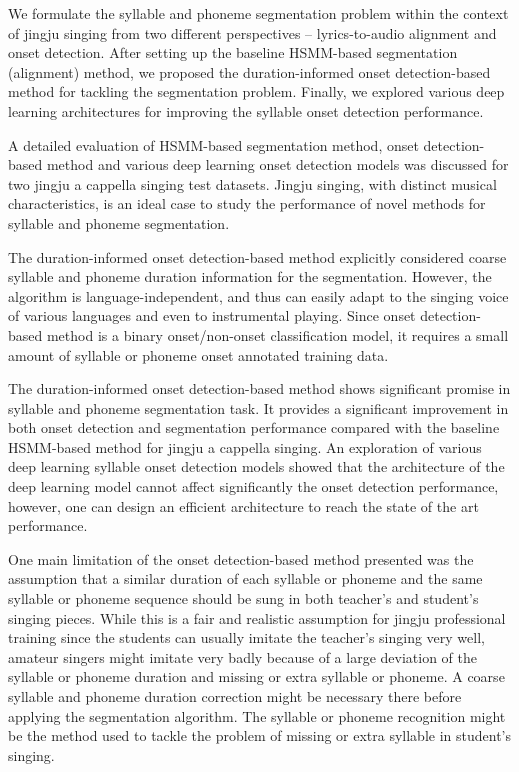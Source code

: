 We formulate the syllable and phoneme segmentation problem within the context of jingju singing from two different perspectives -- lyrics-to-audio alignment and onset detection. After setting up the baseline HSMM-based segmentation (alignment) method, we proposed the duration-informed onset detection-based method for tackling the segmentation problem. Finally, we explored various deep learning architectures for improving the syllable onset detection performance.

A detailed evaluation of HSMM-based segmentation method, onset detection-based method and various deep learning onset detection models was discussed for two jingju a cappella singing test datasets. Jingju singing, with distinct musical characteristics, is an ideal case to study the performance of novel methods for syllable and phoneme segmentation.

The duration-informed onset detection-based method explicitly considered coarse syllable and phoneme duration information for the segmentation. However, the algorithm is language-independent, and thus can easily adapt to the singing voice of various languages and even to instrumental playing. Since onset detection-based method is a binary onset/non-onset classification model, it requires a small amount of syllable or phoneme onset annotated training data.

The duration-informed onset detection-based method shows significant promise in syllable and phoneme segmentation task. It provides a significant improvement in both onset detection and segmentation performance compared with the baseline HSMM-based method for jingju a cappella singing. An exploration of various deep learning syllable onset detection models showed that the architecture of the deep learning model cannot affect significantly the onset detection performance, however, one can design an efficient architecture to reach the state of the art performance.

One main limitation of the onset detection-based method presented was the assumption that a similar duration of each syllable or phoneme and the same syllable or phoneme sequence should be sung in both teacher's and student's singing pieces. While this is a fair and realistic assumption for jingju professional training since the students can usually imitate the teacher's singing very well, amateur singers might imitate very badly because of a large deviation of the syllable or phoneme duration and missing or extra syllable or phoneme. A coarse syllable and phoneme duration correction might be necessary there before applying the segmentation algorithm. The syllable or phoneme recognition might be the method used to tackle the problem of missing or extra syllable in student's singing.

